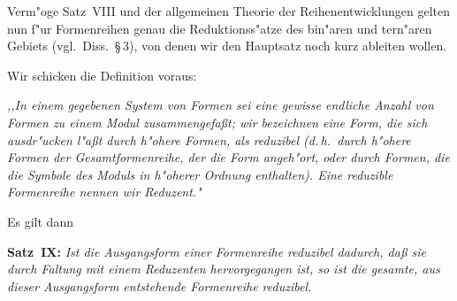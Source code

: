\documentclass[11pt,a4paper]{article}
\begin{document}
Verm"{o}ge Satz~VIII und der allgemeinen Theorie der Reihenentwicklungen
gelten nun f"{u}r Formenreihen genau die Reduktionss"{a}tze des bin"{a}ren und
tern"{a}ren Gebiets (vgl.\ Diss.\ \S\,3), von denen wir den Hauptsatz noch
kurz ableiten wollen.

Wir schicken die Definition voraus:

\smallskip
\noindent
\emph{,,In einem gegebenen System von Formen sei eine gewisse endliche
Anzahl von Formen zu einem Modul zusammengefa\ss{}t; wir bezeichnen eine
Form, die sich ausdr"{u}cken l"{a}\ss{}t durch h"{o}here Formen, als reduzibel
(d.\,h.\ durch h"{o}here Formen der Gesamtformenreihe, der die Form
angeh"{o}rt, oder durch Formen, die die Symbole des Moduls in h"{o}herer
Ordnung enthalten). Eine reduzible Formenreihe nennen wir
Reduzent."{}}

\smallskip
\noindent
Es gilt dann

\medskip
\noindent
\textbf{Satz~IX:} \emph{Ist die Ausgangsform einer Formenreihe reduzibel
dadurch, da\ss{} sie durch Faltung mit einem Reduzenten hervorgegangen ist,
so ist die gesamte, aus dieser Ausgangsform entstehende Formenreihe
reduzibel.}
\end{document}

